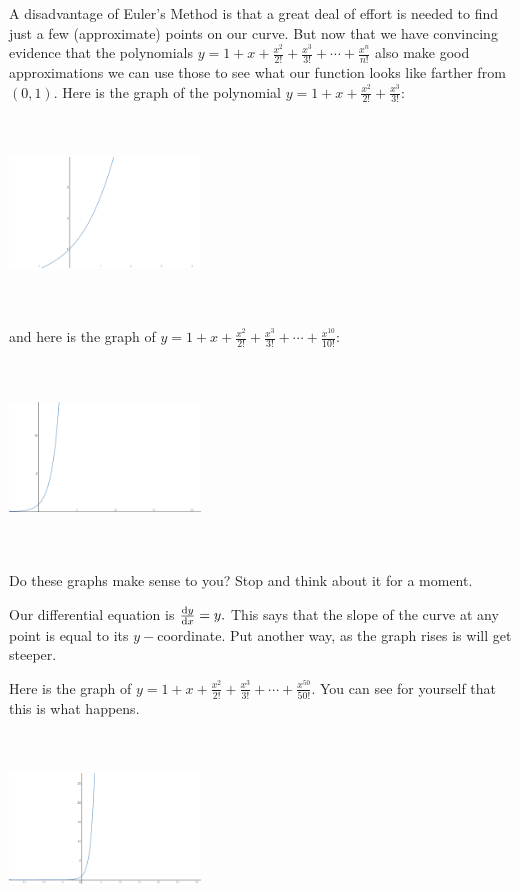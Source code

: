 A disadvantage of Euler's Method is that a great deal of effort is
needed to find just a few (approximate) points on our curve. But now
that we have convincing evidence that the polynomials
$y=1+x+\frac{x^2}{2!}+\frac{x^3}{3!}+ \cdots + \frac{x^n}{n!}$ also
make good approximations we can use those to see what our function
looks like farther from $(0,1).$ Here is the graph of the polynomial
$y=1+x+\frac{x^2}{2!}+\frac{x^3}{3!}:$ \\
\centerline{\includegraphics*[height=2in,width=2in]{Figures/CubicExpApprox}}
and here is the graph of $y=1+x+\frac{x^2}{2!}+\frac{x^3}{3!}+ \cdots
+ \frac{x^{10}}{10!}:$\\
\centerline{\includegraphics*[height=2in,width=2in]{Figures/TenthExp}}

Do these graphs make sense to you? Stop and think about it for a
moment.

Our differential equation is $\frac{\text{d}{y}}{\text{d}{x}}=y.$ This says that
the slope of the curve at any point is equal to its
$y-$coordinate. Put another way, as the graph rises is will get
steeper.

Here is the graph of $y=1+x+\frac{x^2}{2!}+\frac{x^3}{3!}+ \cdots +
\frac{x^{50}}{50!}.$ You can see for yourself that this is what happens.\\
\centerline{\includegraphics*[height=2in,width=2in]{Figures/FiftiethExp}}

